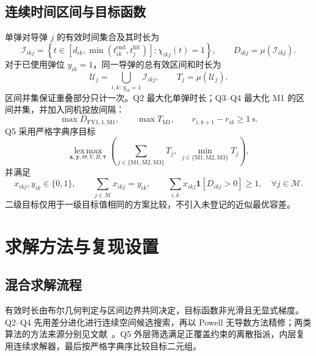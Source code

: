 \documentclass[UTF8,a4paper,zihao=-4]{ctexart}
\newcommand{\vect}[1]{\bm{#1}}
\newcommand{\Tau}{\boldsymbol{\tau}}
\begin{document}
\subsection{连续时间区间与目标函数}

单弹对导弹 \(j\) 的有效时间集合及其时长为
\begin{equation}
\mathcal I_{ikj}=
\left\{t\in\left[d_{ik},\min(t_{ik}^{\mathrm{end}},t_j^{\mathrm{hit}})\right]:
\chi_{ikj}(t)=1\right\},
\qquad D_{ikj}=\mu(\mathcal I_{ikj}).
\label{eq:single-bomb-interval}
\end{equation}
对于已使用弹位 \(y_{ik}=1\)，同一导弹的总有效区间和时长为
\begin{equation}
\mathcal U_j=\bigcup_{i,k:\,y_{ik}=1}\mathcal I_{ikj},
\qquad T_j=\mu(\mathcal U_j).
\label{eq:interval-union}
\end{equation}
区间并集保证重叠部分只计一次。Q2 最大化单弹时长；Q3--Q4 最大化 M1 的区间并集，并加入同机投放间隔：
\begin{equation}
\max D_{\mathrm{FY1},1,\mathrm{M1}},\qquad
\max T_{\mathrm{M1}},\qquad
r_{i,k+1}-r_{ik}\ge1\ \mathrm s.
\label{eq:q234-objective}
\end{equation}
Q5 采用严格字典序目标
\begin{equation}
\operatorname*{lex\,max}_{\vect x,\vect y,\Theta,V,R,\Tau}
\left(\sum_{j\in\{\mathrm{M1,M2,M3}\}}T_j,\ 
\min_{j\in\{\mathrm{M1,M2,M3}\}}T_j\right),
\label{eq:q5-objective}
\end{equation}
并满足
\begin{equation}
x_{ikj},y_{ik}\in\{0,1\},\qquad
\sum_{j\in\mathcal M}x_{ikj}=y_{ik},\qquad
\sum_{i,k}x_{ikj}\mathbf 1[D_{ikj}>0]\ge1,\quad \forall j\in\mathcal M.
\label{eq:q5-assignment}
\end{equation}
二级目标仅用于一级目标值相同的方案比较，不引入未登记的近似最优容差。

\section{求解方法与复现设置}

\subsection{混合求解流程}

有效时长由布尔几何判定与区间边界共同决定，目标函数非光滑且无显式梯度。Q2--Q4 先用差分进化进行连续空间候选搜索，再以 Powell 无导数方法精修；两类算法的方法来源分别见文献~\cite{storn1997de,powell1964efficient}。Q5 外层筛选满足正覆盖约束的离散指派，内层复用连续求解器，最后按严格字典序比较目标二元组。
\end{document}
